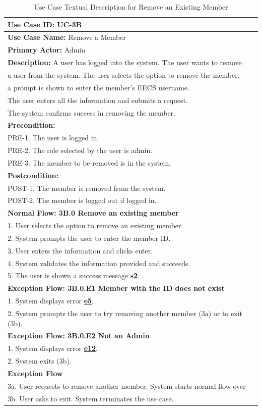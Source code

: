 \documentclass[fontsize=12pt,paper=letter,twoside]{scrartcl}
\begin{document}
\begin{table}[!htb]
\begin{center}
\begin{tabular}{|l|l|}
\hline
\textbf{Use Case ID:} UC-3B \\ \hline
\textbf{Use Case Name:} Remove a Member \\ \hline
\textbf {Primary Actor:} Admin \\ \hline
\textbf{Description:} A user has logged into the system. The user wants to remove\\ a user from the system. The user selects the option to remove the member,\\ a prompt is shown to enter the member's EECS username. \\The user enters all the information and submits a request. \\The system confirms success in removing the member.\\ \hline
\textbf{Precondition:}
\\ PRE-1. The user is logged in.
\\ PRE-2. The role selected by the user is admin.
\\ PRE-3. The member to be removed is in the system. \\ \hline
\textbf{Postcondition:}
\\ POST-1. The member is removed from the system. 
\\ POST-2. The member is logged out if logged in.\\ \hline
\textbf{Normal Flow: 3B.0 Remove an existing member}
\\ 1. User selects the option to remove an existing member.
\\ 2. System prompts the user to enter the member ID.
\\ 3. User enters the information and clicks enter.
\\ 4. System validates the information provided and succeeds.
\\ 5. The user is shown a success message \hyperref[app:success]{\textbf{s2}}.
.\\ \hline
\textbf{Exception Flow: 3B.0.E1 Member with the ID does not exist}
\\ 1. System displays error \hyperref[app:error]{\textbf{e5}}.
\\ 2. System prompts the user to try removing another member (3a) or to exit (3b).
\\ \hline
\textbf{Exception Flow: 3B.0.E2 Not an Admin}
\\ 1. System displays error  \hyperref[app:error]{\textbf{e12}}.
\\ 2. System exits (3b). \\ \hline 
\textbf{Exception Flow}
\\ 3a. User requests to remove another member. System starts normal flow over
\\ 3b. User asks to exit. System terminates the use case.\\ \hline
\end{tabular}
\end{center}
\caption {Use Case Textual Description for Remove an Existing Member}
\label{tbl:uc3Btd}
\end{table}
\end{document}
